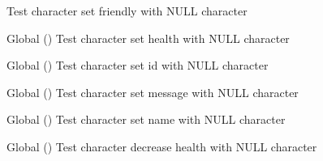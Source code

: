 \begin{DoxyRefList}
%
Test character set friendly with NULL character  
\item[Global \doxylink{character__test_8c_ac5e97fabc0591e9b2021d0ced0b39300}{test2\+\_\+character\+\_\+set\+\_\+health} ()]\label{test__test000017}%
%
Test character set health with NULL character  
\item[Global \doxylink{character__test_8c_acee8dbf1f524f775b598e4a58136cc53}{test2\+\_\+character\+\_\+set\+\_\+id} ()]\label{test__test000005}%
%
Test character set id with NULL character  
\item[Global \doxylink{character__test_8c_afae2256c79ebaf31b7402307dad69253}{test2\+\_\+character\+\_\+set\+\_\+message} ()]\label{test__test000027}%
%
Test character set message with NULL character  
\item[Global \doxylink{character__test_8c_a74b160bc91661973b864acec8b9a16ce}{test2\+\_\+character\+\_\+set\+\_\+name} ()]\label{test__test000009}%
%
Test character set name with NULL character  
\item[Global \doxylink{player__test_8c_a8c0cb9c6989aa43c2e38c120a6644250}{test2\+\_\+decrease\+\_\+health} ()]\label{test__test000019}%
%
Test character decrease health with NULL character 


\end{DoxyRefList}
